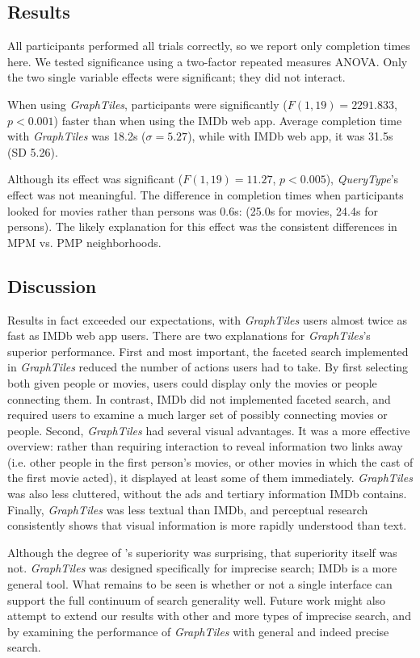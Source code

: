 \subsection{Results}

All participants performed all trials correctly, so we report only completion times here. We tested significance using a two-factor repeated measures ANOVA. Only the two single variable effects were significant; they did not interact. 

When using \textit{GraphTiles}, participants were significantly ($F(1,19)=2291.833$, $p<0.001$) faster than when using the IMDb web app. Average completion time with \textit{GraphTiles} was 18.2s ($\sigma =5.27$), while with IMDb web app, it was 31.5s (SD 5.26).

Although its effect was significant ($F(1,19)=11.27$, $p<0.005$), \textit{QueryType}'s effect was not meaningful. The difference in completion times when participants looked for movies rather than persons was 0.6s: (25.0s for movies, 24.4s for persons). The likely explanation for this effect was the consistent differences in MPM vs. PMP neighborhoods.


\subsection{Discussion}

Results in fact exceeded our expectations, with \textit{GraphTiles} users almost twice as fast as IMDb web app users. There are two explanations for \textit{GraphTiles}'s superior performance. First and most important, the faceted search implemented in \textit{GraphTiles} reduced the number of actions users had to take. By first selecting both given people or movies, users could display only the movies or people connecting them. In contrast, IMDb did not implemented faceted search, and required users to examine a much larger set of possibly connecting movies or people. Second, \textit{GraphTiles} had several visual advantages. It was a more effective overview: rather than requiring interaction to reveal information two links away (i.e. other people in the first person's movies, or other movies in which the cast of the first movie acted), it displayed at least some of them immediately. \textit{GraphTiles} was also less cluttered, without the ads and tertiary information IMDb contains. Finally, \textit{GraphTiles} was less textual than IMDb, and perceptual research consistently shows that visual information is more rapidly understood than text.

Although the degree of 's superiority was surprising, that superiority itself was not. \textit{GraphTiles} was designed specifically for imprecise search; IMDb is a more general tool. What remains to be seen is whether or not a single interface can support the full continuum of search generality well. Future work might also attempt to extend our results with other and more types of imprecise search, and by examining the performance of \textit{GraphTiles} with general and indeed precise search.
